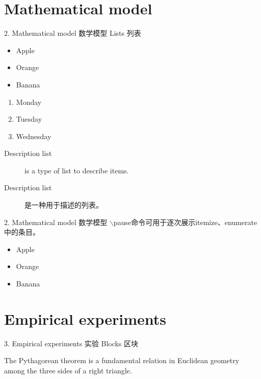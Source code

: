 \documentclass[CJKutf8]{beamer}
\begin{document}
\begin{CJK*}{UTF8}{gbsn}
  \section{Mathematical model}
  \label{Sec:model}
  \begin{frame}{2. Mathematical model 数学模型}
    Lists 列表

    \begin{itemize}
    \item Apple
    \item Orange
    \item Banana
    \end{itemize}

    \begin{enumerate}
    \item Monday
    \item Tuesday
    \item Wednesday
    \end{enumerate}

    \begin{description}
    \item[Description list] is a type of list to describe items.
    \item[Description list] 是一种用于描述的列表。
    \end{description}
  \end{frame} %
  
  \begin{frame}{2. Mathematical model 数学模型}
    $\backslash$pause命令可用于逐次展示itemize、enumerate中的条目。

    \begin{itemize}
    \pause
    \item Apple
    \pause
    \item Orange
    \pause
    \item Banana
    \end{itemize}
  \end{frame} %
  
  \section{Empirical experiments}
  \label{Sec:experiments}
  \begin{frame}{3. Empirical experiments 实验}
    Blocks 区块

      \begin{definition}
        The Pythagorean theorem is a fundamental relation in Euclidean geometry among the three sides of a right triangle.
      \end{definition}


\end{frame}
\end{CJK*}
\end{document}
